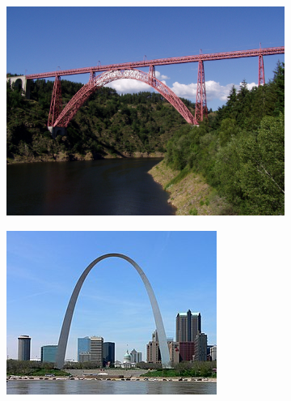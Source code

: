 \documentclass{article}
\begin{document}
\begin{figure}[h!]
    \centering
    \begin{subfigure}[b]{0.3\linewidth}
        \includegraphics[width=\linewidth]{extra/viadotto_di_garabit.jpg} 
    \end{subfigure}
    \begin{subfigure}[b]{0.3\linewidth}
        \includegraphics[width=\linewidth]{extra/st_louis_arco.jpg} 
    \end{subfigure}
    \begin{subfigure}[b]{0.3\linewidth}

\end{subfigure}
\end{figure}
\end{document}
